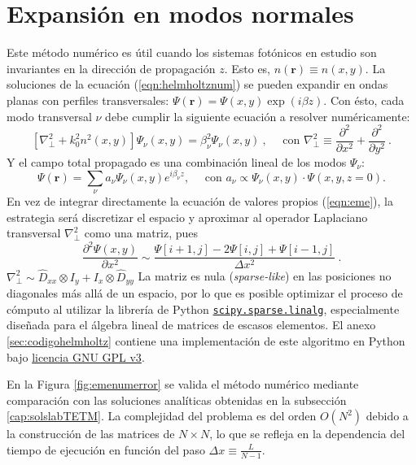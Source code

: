 \section{Expansión en modos normales \label{cap:eme}}
Este método numérico es útil cuando los sistemas fotónicos en estudio son invariantes en la dirección de propagación $z$. Esto es, $n(\textbf{r})\equiv n(x,y)$. La soluciones de la ecuación (\ref{eqn:helmholtznum}) se pueden expandir en ondas planas con perfiles transversales: $\Psi(\textbf{r}) = \Psi(x,y) \exp({i\beta z})$. Con ésto, cada modo transversal $\nu$ debe cumplir la siguiente ecuación a resolver numéricamente:
\begin{equation}
	\left[\nabla_\perp^2 + k_0^2 n^2(x,y)\right]\Psi_\nu(x,y) = \beta_\nu^2\Psi_\nu(x,y) \ , \quad\text{ con } \nabla_\perp^2 \equiv \frac{\partial^2}{\partial x^2} + \frac{\partial^2}{\partial y^2} \ .
	\label{eqn:eme}
\end{equation}
Y el campo total propagado es una combinación lineal de los modos $\Psi_\nu$: 
\begin{equation}
	\Psi(\textbf{r}) = \sum_\nu a_\nu \Psi_\nu(x,y) e^{i\beta_\nu z}, \quad\text{ con } a_\nu \propto \Psi_\nu(x,y) \cdot \Psi(x, y, z=0).
\end{equation}
En vez de integrar directamente la ecuación de valores propios (\ref{eqn:eme}), la estrategia será discretizar el espacio y aproximar al operador Laplaciano transversal $\nabla_\perp^2$ como una matriz, pues $$\frac{\partial^2 \Psi(x,y)}{\partial x^2} \sim \frac{\Psi[i+1,j]-2\Psi[i,j]+\Psi[i-1,j]}{\Delta x ^2}  \ .
$$
$\nabla^2_\perp \sim \hat{D}_{xx} \otimes I_y + I_x \otimes \hat{D}_{yy}$
La matriz es nula (\textit{sparse-like}) en las posiciones no diagonales más allá de un espacio, por lo que es posible optimizar el proceso de cómputo al utilizar la librería de Python \href{https://docs.scipy.org/doc/scipy/reference/sparse.linalg.html}{\color{magenta}\texttt{scipy.sparse.linalg}}, especialmente diseñada para el álgebra lineal de matrices de escasos elementos. El anexo \ref{sec:codigohelmholtz} contiene una implementación de este algoritmo en Python bajo \href{https://www.gnu.org/licenses/gpl-3.0.html}{\color{magenta}licencia GNU GPL v3}.

En la Figura \ref{fig:emenumerror} se valida el método numérico mediante comparación con las soluciones analíticas obtenidas en la subsección \ref{cap:solslabTETM}. La complejidad del problema es del orden $O(N^2)$ debido a la construcción de las matrices de $N\times N$, lo que se refleja en la dependencia del tiempo de ejecución en función del paso $\Delta x \equiv \frac{L}{N-1}$.


